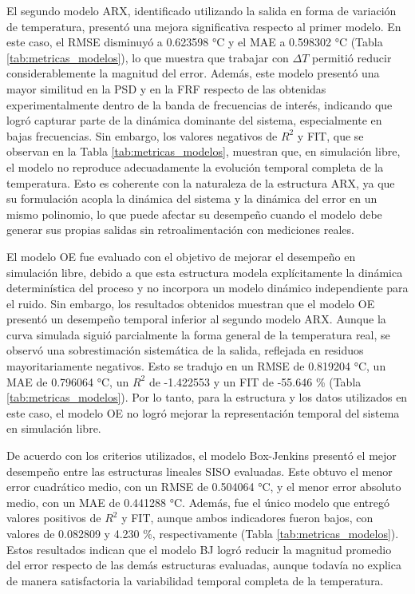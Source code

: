 \documentclass[11pt]{report}
\begin{document}
El segundo modelo ARX, identificado utilizando la salida en forma de variación de temperatura, presentó una mejora significativa respecto al primer modelo. En este caso, el RMSE disminuyó a 0.623598 °C y el MAE a 0.598302 °C (Tabla \ref{tab:metricas_modelos}), lo que muestra que trabajar con $\Delta T$ permitió reducir considerablemente la magnitud del error. Además, este modelo presentó una mayor similitud en la PSD y en la FRF respecto de las obtenidas experimentalmente dentro de la banda de frecuencias de interés, indicando que logró capturar parte de la dinámica dominante del sistema, especialmente en bajas frecuencias. Sin embargo, los valores negativos de $R^2$ y FIT, que se observan en la Tabla \ref{tab:metricas_modelos}, muestran que, en simulación libre, el modelo no reproduce adecuadamente la evolución temporal completa de la temperatura. Esto es coherente con la naturaleza de la estructura ARX, ya que su formulación acopla la dinámica del sistema y la dinámica del error en un mismo polinomio, lo que puede afectar su desempeño cuando el modelo debe generar sus propias salidas sin retroalimentación con mediciones reales.

El modelo OE fue evaluado con el objetivo de mejorar el desempeño en simulación libre, debido a que esta estructura modela explícitamente la dinámica determinística del proceso y no incorpora un modelo dinámico independiente para el ruido. Sin embargo, los resultados obtenidos muestran que el modelo OE presentó un desempeño temporal inferior al segundo modelo ARX. Aunque la curva simulada siguió parcialmente la forma general de la temperatura real, se observó una sobrestimación sistemática de la salida, reflejada en residuos mayoritariamente negativos. Esto se tradujo en un RMSE de 0.819204 °C, un MAE de 0.796064 °C, un $R^2$ de -1.422553 y un FIT de -55.646 \% (Tabla \ref{tab:metricas_modelos}). Por lo tanto, para la estructura y los datos utilizados en este caso, el modelo OE no logró mejorar la representación temporal del sistema en simulación libre.

De acuerdo con los criterios utilizados, el modelo Box-Jenkins presentó el mejor desempeño entre las estructuras lineales SISO evaluadas. Este obtuvo el menor error cuadrático medio, con un RMSE de 0.504064 °C, y el menor error absoluto medio, con un MAE de 0.441288 °C. Además, fue el único modelo que entregó valores positivos de $R^2$ y FIT, aunque ambos indicadores fueron bajos, con valores de 0.082809 y 4.230 \%, respectivamente (Tabla \ref{tab:metricas_modelos}). Estos resultados indican que el modelo BJ logró reducir la magnitud promedio del error respecto de las demás estructuras evaluadas, aunque todavía no explica de manera satisfactoria la variabilidad temporal completa de la temperatura.
\end{document}
